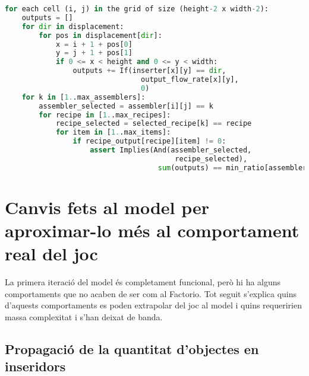 \begin{lstlisting}[language=Python, caption=Item Output, label=code:item_output]
for each cell (i, j) in the grid of size (height-2 x width-2):
    outputs = []
    for dir in displacement:
        for pos in displacement[dir]:
            x = i + 1 + pos[0]
            y = j + 1 + pos[1]
            if 0 <= x < height and 0 <= y < width:
                outputs += If(inserter[x][y] == dir,
                                output_flow_rate[x][y],
                                0)
    for k in [1..max_assemblers]:
        assembler_selected = assembler[i][j] == k
        for recipe in [1..max_recipes]:
            recipe_selected = selected_recipe[k] == recipe
            for item in [1..max_items]:
                if recipe_output[recipe][item] != 0:
                    assert Implies(And(assembler_selected,
                                        recipe_selected),
                                    sum(outputs) == min_ratio[assembler] * recipe_output[recipe][item])
\end{lstlisting}


\section{Canvis fets al model per aproximar-lo més al comportament real del joc}\label{mecanics-changes}

La primera iteració del model és completament funcional, però hi ha alguns comportaments que no acaben de ser com al Factorio. Tot seguit s'explica quins d'aquests comportaments es poden extrapolar del joc al model i quins requeririen massa complexitat i s'han deixat de banda.

\subsection{Propagació de la quantitat d'objectes en inseridors}\label{subsec:inserter_flow_propagation_improv}


